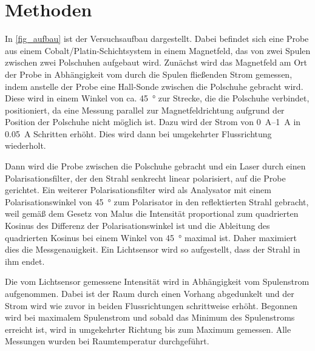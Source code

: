 \documentclass[
	a4paper,
	12pt,
	pagesize,
	ngerman
]{scrartcl}
\begin{document}
	\section{Methoden}
	In \cref{fig_aufbau} ist der Versuchsaufbau dargestellt.
	Dabei befindet sich eine Probe aus einem Cobalt/Platin-Schichtsystem in einem Magnetfeld, das von zwei Spulen zwischen zwei Polschuhen aufgebaut wird.
	Zunächst wird das Magnetfeld am Ort der Probe in Abhängigkeit vom durch die Spulen fließenden Strom gemessen, indem anstelle der Probe eine Hall-Sonde zwischen die Polschuhe gebracht wird.
	Diese wird in einem Winkel von ca. \SI{45}{\degree} zur Strecke, die die Polschuhe verbindet, positioniert, da eine Messung parallel zur Magnetfeldrichtung aufgrund der Position der Polschuhe nicht möglich ist.
	Dazu wird der Strom von \SIrange{0}{1}{\ampere} in \SI{0,05}{\ampere} Schritten erhöht.
	Dies wird dann bei umgekehrter Flussrichtung wiederholt.

	Dann wird die Probe zwischen die Polschuhe gebracht und ein Laser durch einen Polarisationsfilter, der den Strahl senkrecht linear polarisiert, auf die Probe gerichtet.
	Ein weiterer Polarisationsfilter wird als Analysator mit einem Polarisationswinkel von \SI{45}{\degree} zum Polarisator in den reflektierten Strahl gebracht, weil gemäß dem Gesetz von Malus die Intensität proportional zum quadrierten Kosinus des Differenz der Polarisationswinkel ist und die Ableitung des quadrierten Kosinus bei einem Winkel von \SI{45}{\degree} maximal ist. %
	Daher maximiert dies die Messgenauigkeit.
	Ein Lichtsensor wird so aufgestellt, dass der Strahl in ihm endet.
	
	Die vom Lichtsensor gemessene Intensität wird in Abhängigkeit vom Spulenstrom aufgenommen.
	Dabei ist der Raum durch einen Vorhang abgedunkelt und der Strom wird wie zuvor in beiden Flussrichtungen schrittweise erhöht.
	Begonnen wird bei maximalem Spulenstrom und sobald das Minimum des Spulenstroms erreicht ist,  wird in umgekehrter Richtung bis zum Maximum gemessen.
	Alle Messungen wurden bei Raumtemperatur durchgeführt.
	
\end{document}
